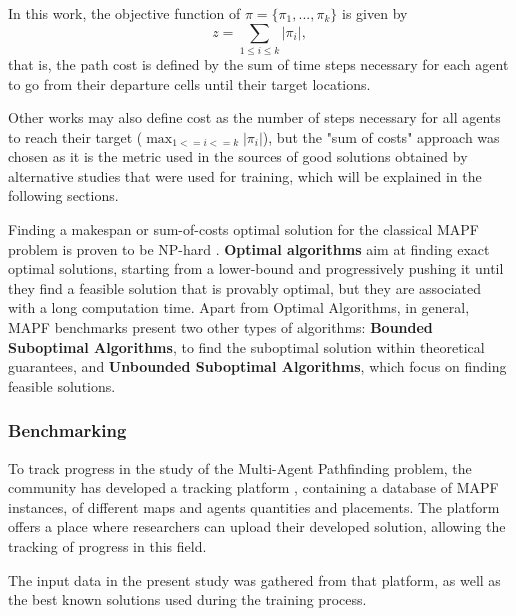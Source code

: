 \begin{enumerate}
    In this work, the objective function of \(\pi = \{\pi_1,...,\pi_k\}\) is given by
    \[
    z = \sum_{1 \leq i \leq k}|\pi_i|, \tag{2}
    \]
    that is, the path cost is defined by the sum of time steps necessary for each agent to go from their departure cells until their target locations.

    Other works may also define cost as the number of steps necessary for all agents to reach their target (\(\max_{1<=i<=k}|\pi_i|\)), but the "sum of costs" approach was chosen as it is the metric used in the sources of good solutions obtained by alternative studies that were used for training, which will be explained in the following sections.
\end{enumerate}

Finding a makespan or sum-of-costs optimal solution for the classical MAPF problem is proven to be NP-hard \cite{yuStructureIntractabilityOptimal2013}. \textbf{Optimal algorithms} aim at finding exact optimal solutions, starting from a lower-bound and progressively pushing it until they find a feasible solution that is provably optimal, but they are associated with a long computation time. Apart from Optimal Algorithms, in general, MAPF benchmarks present two other types of algorithms: \textbf{Bounded Suboptimal Algorithms}, to find the suboptimal solution within theoretical guarantees, and \textbf{Unbounded Suboptimal Algorithms}, which focus on finding feasible solutions. 

\subsubsection{Benchmarking}

To track progress in the study of the Multi-Agent Pathfinding problem, the community has developed a tracking platform \cite{shenTrackingProgressMultiAgent2023}, containing a database of MAPF instances, of different maps and agents quantities and placements. The platform offers a place where researchers can upload their developed solution, allowing the tracking of progress in this field.

The input data in the present study was gathered from that platform, as well as the best known solutions used during the training process.

